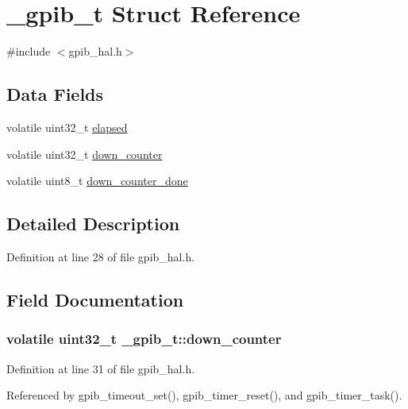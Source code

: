 \hypertarget{struct__gpib__t}{}\section{\+\_\+gpib\+\_\+t Struct Reference}
\label{struct__gpib__t}


{\ttfamily \#include $<$gpib\+\_\+hal.\+h$>$}

\subsection*{Data Fields}
\begin{DoxyCompactItemize}
\item 
volatile uint32\+\_\+t \hyperlink{struct__gpib__t_a99a38aef880eb075f625f33d7bac31dd}{elapsed}
\item 
volatile uint32\+\_\+t \hyperlink{struct__gpib__t_a21ed3be06f76b0a5237b5e64bc2e8793}{down\+\_\+counter}
\item 
volatile uint8\+\_\+t \hyperlink{struct__gpib__t_af2622dd8668ecb24c42a2da2d8956538}{down\+\_\+counter\+\_\+done}
\end{DoxyCompactItemize}


\subsection{Detailed Description}


Definition at line 28 of file gpib\+\_\+hal.\+h.



\subsection{Field Documentation}
\subsubsection[{\texorpdfstring{down\+\_\+counter}{down_counter}}]{\setlength{\rightskip}{0pt plus 5cm}volatile uint32\+\_\+t \+\_\+gpib\+\_\+t\+::down\+\_\+counter}\hypertarget{struct__gpib__t_a21ed3be06f76b0a5237b5e64bc2e8793}{}\label{struct__gpib__t_a21ed3be06f76b0a5237b5e64bc2e8793}


Definition at line 31 of file gpib\+\_\+hal.\+h.



Referenced by gpib\+\_\+timeout\+\_\+set(), gpib\+\_\+timer\+\_\+reset(), and gpib\+\_\+timer\+\_\+task().

